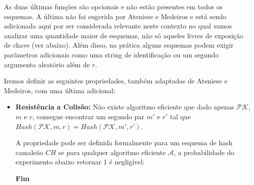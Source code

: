 \documentclass[a4paper]{article}
\begin{document}
As duas últimas funções são opcionais e não estão presentes em todos
os esquemas. A última não foi sugerida por Ateniese e Medeiros e está
sendo adicionada aqui por ser considerada relevante neste contexto no
qual vamos analizar uma quantidade maior de esquemas, não só aqueles
livres de exposição de chave (ver abaixo).  Além disso, na prática
alguns esquemas podem exigir parâmetros adicionais como uma string de
identificação ou um segundo argumento aleatório além de $r$.

Iremos definir as seguintes propriedades, também adaptadas de Ateniese
e Medeiros, com uma última adicional:

\begin{itemize}
\item\textbf{Resistência a Colisão: }Não existe algoritmo eficiente
  que dado apenas $\mathcal{PK}$, $m$ e $r$, consegue encontrar um
  segundo par $m'$ e $r'$ tal que $Hash(\mathcal{PK}, m, r) =
  Hash(\mathcal{PK}, m', r')$.

  A propriedade pode ser definida formalmente para um esquema de hash
  camaleão $CH$ se para qualquer algoritmo eficiente $\mathcal{A}$, a
  probabilidade do experimento abaixo retornar 1 é negligível:

  \begin{algorithm}[H]
    \SetAlgoLined
     \textbf{Fim}
  \end{algorithm}
  

\end{itemize}
\end{document}
